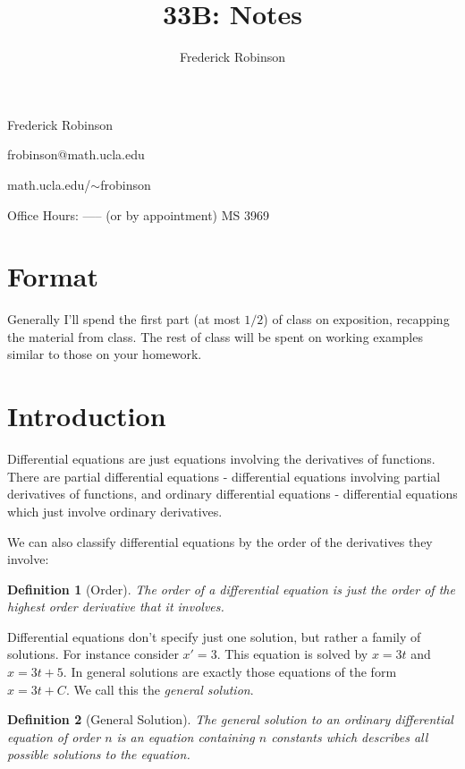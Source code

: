 \documentclass[14pt]{article}
\title{33B: Notes}
\author{Frederick Robinson}
\newtheorem{defn}{Definition}
\begin{document}
\maketitle
\tableofcontents
\pagebreak

Frederick Robinson

frobinson@math.ucla.edu

math.ucla.edu/$\sim$frobinson

Office Hours: ----- (or by appointment)
MS 3969

\section*{Format}

Generally I'll spend the first part (at most $1/2$) of class on exposition, recapping the material
from class. The rest of class will be spent on working examples similar to those on your homework. 

\pagebreak

\section{Introduction}

Differential equations are just equations involving the derivatives of functions. There are partial
differential equations - differential equations involving partial derivatives of functions, and
ordinary differential equations - differential equations which just involve ordinary derivatives. 

We can also classify differential equations by the order of the derivatives they involve:
\begin{defn}[Order]The \emph{order} of a differential equation is just the order of the highest
  order derivative that it involves.\end{defn}

Differential equations don't specify just one solution, but rather a family of solutions. For
instance consider $x' = 3$. This equation is solved by $x = 3t$ and $x = 3t + 5$. In general
solutions are exactly those equations of the form $x = 3t + C$. We call this the \emph{general
  solution}.

\begin{defn}[General Solution]
  The \emph{general solution} to an ordinary differential equation of order $n$ is an equation
  containing $n$ constants which describes all possible solutions to the equation. 
\end{defn}
\end{document}
